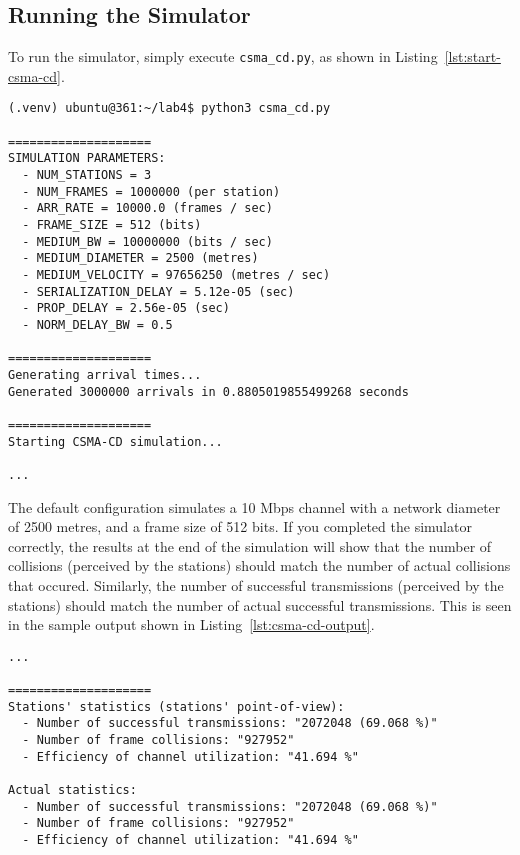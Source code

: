 \documentclass[11pt]{article}
\begin{document}
\subsection{Running the Simulator}
\label{subsec:running-simulator}
To run the simulator, simply execute \texttt{csma\_cd.py}, as shown in Listing~\ref{lst:start-csma-cd}.
\begin{lstlisting}[style=ece361shell, caption={Running the CSMA/CD simulator}, label={lst:start-csma-cd}]
(.venv) ubuntu@361:~/lab4$ python3 csma_cd.py

====================
SIMULATION PARAMETERS:
  - NUM_STATIONS = 3
  - NUM_FRAMES = 1000000 (per station)
  - ARR_RATE = 10000.0 (frames / sec)
  - FRAME_SIZE = 512 (bits)
  - MEDIUM_BW = 10000000 (bits / sec)
  - MEDIUM_DIAMETER = 2500 (metres)
  - MEDIUM_VELOCITY = 97656250 (metres / sec)
  - SERIALIZATION_DELAY = 5.12e-05 (sec)
  - PROP_DELAY = 2.56e-05 (sec)
  - NORM_DELAY_BW = 0.5

====================
Generating arrival times...
Generated 3000000 arrivals in 0.8805019855499268 seconds

====================
Starting CSMA-CD simulation...

...

\end{lstlisting}

The default configuration simulates a 10 Mbps channel with a network diameter of 2500 metres, and a frame size of 512 bits.
If you completed the simulator correctly, the results at the end of the simulation will show that the number of collisions (perceived by the stations) should match the number of actual collisions that occured.
Similarly, the number of successful transmissions (perceived by the stations) should match the number of actual successful transmissions.
This is seen in the sample output shown in Listing~\ref{lst:csma-cd-output}.



\begin{lstlisting}[style=ece361shell, caption={Sample output of CSMA/CD simulator, where the stations accurately counted the number of collisions.}, label={lst:csma-cd-output}]
...

====================
Stations' statistics (stations' point-of-view):
  - Number of successful transmissions: "2072048 (69.068 %)"
  - Number of frame collisions: "927952"
  - Efficiency of channel utilization: "41.694 %"

Actual statistics:
  - Number of successful transmissions: "2072048 (69.068 %)"
  - Number of frame collisions: "927952"
  - Efficiency of channel utilization: "41.694 %"
\end{lstlisting}
\end{document}
